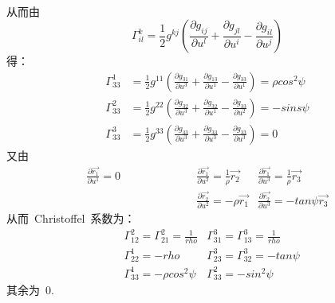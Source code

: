 \\
从而由\ 
$$
\varGamma^k_{il}=\frac{1}{2}g^{kj}(\frac{\partial g_{ij}}{\partial u^l}+\frac{\partial g_{jl}}{\partial u^i}-\frac{\partial g_{il}}{\partial u^j})
$$
得：
\begin{align*}
\varGamma^1_{33}&=\frac{1}{2}g^{11}(\frac{\partial g_{31}}{\partial u^3}+\frac{\partial g_{13}}{\partial u^1}-\frac{\partial g_{33}}{\partial u^1})=\rho cos^2\psi
\\
\varGamma^2_{33}&=\frac{1}{2}g^{22}(\frac{\partial g_{32}}{\partial u^3}+\frac{\partial g_{32}}{\partial u^1}-\frac{\partial g_{33}}{\partial u^2})=-sins\psi 
\\
\varGamma^3_{33}&=\frac{1}{2}g^{33}(\frac{\partial g_{33}}{\partial u^3}+\frac{\partial g_{33}}{\partial u^3}-\frac{\partial g_{33}}{\partial u^3})=0
\end{align*}
又由
\begin{align*}
 \frac{\partial \overrightarrow{r_1}}{\partial u^1}=0\qquad \qquad \qquad  &\frac{\partial \overrightarrow{r_1}}{\partial u^2}=\frac{1}{\rho}\overrightarrow{r_2}  &\frac{\partial \overrightarrow{r_1}}{\partial u^3}=\frac{1}{\rho}\overrightarrow{r_3}
\\
     &\frac{\partial \overrightarrow{r_2}}{\partial u^2}=-\rho \overrightarrow{r_1} &\frac{\partial \overrightarrow{r_2}}{\partial u^3}=-tan\psi  \overrightarrow{r_3}
\end{align*}
从而\ Christoffel\ 系数为：
\begin{align*}
&\varGamma^2_{12}=\varGamma^2_{21}=\frac{1}{rho} &\varGamma^3_{31}=\varGamma^3_{13}=\frac{1}{rho}
\\
&\varGamma^1_{22}=-rho &\varGamma^3_{23}=\varGamma^3_{32}=-tan\psi 
\\
&\varGamma^1_{33}=-\rho cos^2\psi  &\varGamma^2_{33}=-sin^2\psi 
\end{align*}
其余为\ 0.


